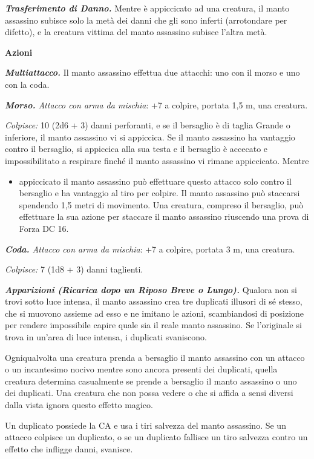 \begin{multicols}{2}
\emph{\textbf{Trasferimento di Danno.}} Mentre è appiccicato ad una
creatura, il manto assassino subisce solo la metà dei danni che gli sono
inferti (arrotondare per difetto), e la creatura vittima del manto
assassino subisce l'altra metà.

\textbf{Azioni}

\emph{\textbf{Multiattacco.}} Il manto assassino effettua due attacchi:
uno con il morso e uno con la coda.

\emph{\textbf{Morso.} Attacco con arma da mischia}: +7 a colpire,
portata 1,5 m, una creatura.

\emph{Colpisce:} 10 (2d6 + 3) danni perforanti, e se il bersaglio è di
taglia Grande o inferiore, il manto assassino vi si appiccica. Se il
manto assassino ha vantaggio contro il bersaglio, si appiccica alla sua
testa e il bersaglio è accecato e impossibilitato a respirare finché il
manto assassino vi rimane appiccicato. Mentre


\begin{itemize}
\item
  appiccicato il manto assassino può effettuare questo attacco solo
  contro il bersaglio e ha vantaggio al tiro per colpire. Il manto
  assassino può staccarsi spendendo 1,5 metri di movimento. Una
  creatura, compreso il bersaglio, può effettuare la sua azione per
  staccare il manto assassino riuscendo una prova di Forza DC 16.
\end{itemize}


\emph{\textbf{Coda.} Attacco con arma da mischia}: +7 a colpire, portata
3 m, una creatura.

\emph{Colpisce:} 7 (1d8 + 3) danni taglienti.

\emph{\textbf{Apparizioni (Ricarica dopo un Riposo Breve o Lungo).}}
Qualora non si trovi sotto luce intensa, il manto assassino crea tre
duplicati illusori di sé stesso, che si muovono assieme ad esso e ne
imitano le azioni, scambiandosi di posizione per rendere impossibile
capire quale sia il reale manto assassino. Se l'originale si trova in
un'area di luce intensa, i duplicati svaniscono.

Ogniqualvolta una creatura prenda a bersaglio il manto assassino con un
attacco o un incantesimo nocivo mentre sono ancora presenti dei
duplicati, quella creatura determina casualmente se prende a bersaglio
il manto assassino o uno dei duplicati. Una creatura che non possa
vedere o che si affida a sensi diversi dalla vista ignora questo effetto
magico.

Un duplicato possiede la CA e usa i tiri salvezza del manto assassino.
Se un attacco colpisce un duplicato, o se un duplicato fallisce un tiro
salvezza contro un effetto che infligge danni, svanisce.


\end{multicols}
